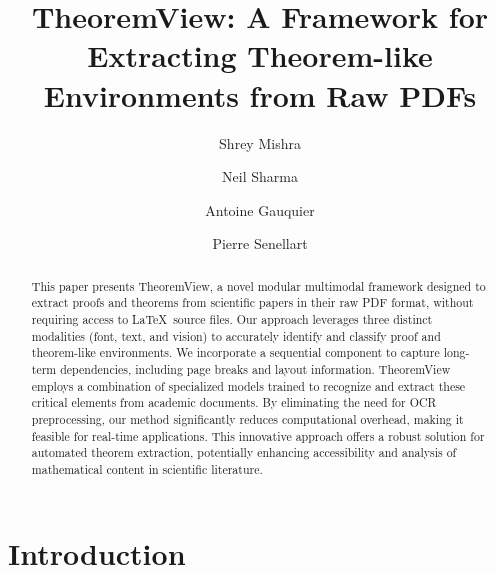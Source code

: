 \documentclass[runningheads]{llncs}
\begin{document}
%
\title{TheoremView: A Framework for Extracting Theorem-like Environments from Raw PDFs}
%
%
\author{Shrey Mishra \and
Neil Sharma \and
Antoine Gauquier \and
Pierre Senellart}



\maketitle              %
%
\begin{abstract}
This paper presents TheoremView, a novel modular multimodal framework designed 
to extract proofs and theorems from scientific papers in their raw PDF format, 
without requiring access to \LaTeX~source files. Our approach leverages three 
distinct modalities (font, text, and vision) to accurately identify and classify 
proof and theorem-like environments. We incorporate a sequential component to capture 
long-term dependencies, including page breaks and layout information. 
TheoremView employs a combination of specialized models trained to recognize 
and extract these critical elements from academic documents. By eliminating 
the need for OCR preprocessing, our method significantly reduces computational 
overhead, making it feasible for real-time applications. This innovative 
approach offers a robust solution for automated theorem extraction, potentially 
enhancing accessibility and analysis of mathematical content in scientific 
literature.

\end{abstract}
%
%
%
\section{Introduction}
\end{document}
